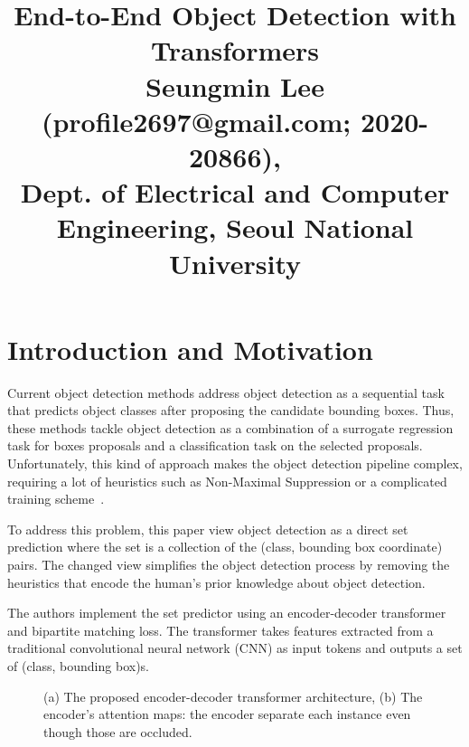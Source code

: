 \documentclass[10pt,twocolumn,letterpaper]{article}
\begin{document}
\title{End-to-End Object Detection with Transformers\\ {\rm {\normalsize Seungmin Lee (profile2697@gmail.com; 2020-20866), \\Dept. of Electrical and Computer Engineering, Seoul National University}}}   %

\maketitle
\thispagestyle{empty}

\section{Introduction and Motivation}
Current object detection methods address object detection as a sequential task that predicts object classes after proposing the candidate bounding boxes. Thus, these methods tackle object detection as a combination of a surrogate regression task for boxes proposals and a classification task on the selected proposals. Unfortunately, this kind of approach makes the object detection pipeline complex, requiring a lot of heuristics such as Non-Maximal Suppression or a complicated training scheme~\cite{}.

To address this problem, this paper view object detection as a direct set prediction where the set is a collection of the (class, bounding box coordinate) pairs. The changed view simplifies the object detection process by removing the heuristics that encode the human's prior knowledge about object detection.

The authors implement the set predictor using an encoder-decoder transformer and bipartite matching loss. The transformer takes features extracted from a traditional convolutional neural network (CNN) as input tokens and outputs a set of (class, bounding box)s. 

\begin{figure}[b]
	\centering
	\caption{(a) The proposed encoder-decoder transformer architecture, (b) The encoder's attention maps: the encoder separate each instance even though those are occluded.}
	\label{fig:imgs}
\end{figure}
\end{document}
